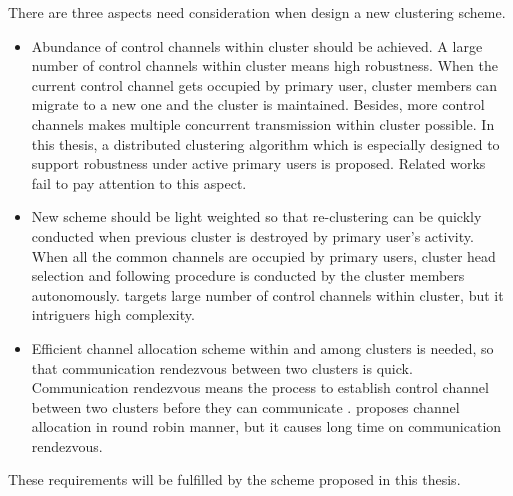 There are three aspects need consideration when design a new clustering scheme.
\begin{itemize}
\item Abundance of control channels within cluster should be achieved.
A large number of control channels within cluster means high robustness.
When the current control channel gets occupied by primary user, cluster members can migrate to a new one and the cluster is maintained.
Besides, more control channels makes multiple concurrent transmission within cluster possible.
In this thesis, a distributed clustering algorithm which is especially designed to support robustness under active primary users is proposed.
Related works~\cite{Zhao07,Affinity_clustering_09icccn,Consensus_based_clustering12,clustering_globecom11} fail to pay attention to this aspect.

\item New scheme should be light weighted so that re-clustering can be quickly conducted when previous cluster is destroyed by primary user's activity.
When all the common channels are occupied by primary users, cluster head selection and following procedure is conducted by the cluster members autonomously.
\cite{LIU_TMC11_2} targets large number of control channels within cluster, but it intriguers high complexity.


\item Efficient channel allocation scheme within and among clusters is needed, so that communication rendezvous between two clusters is quick. 
Communication rendezvous means the process to establish control channel between two clusters before they can communicate .
\cite{LIU_TMC11_2} proposes channel allocation in round robin manner, but it causes long time on communication rendezvous.
\end{itemize}

These requirements will be fulfilled by the scheme proposed in this thesis.




